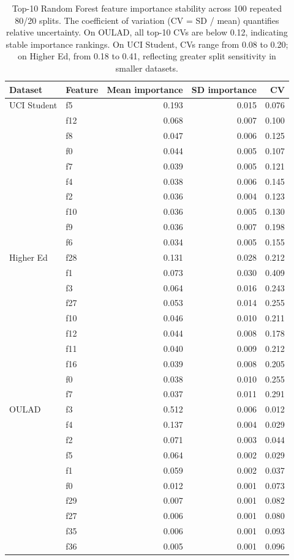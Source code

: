 \documentclass[10pt,letterpaper]{article}
\begin{document}
\begin{table}[H]
\centering
\caption{Top-10 Random Forest feature importance stability across 100 repeated 80/20 splits. The coefficient of variation (CV = SD / mean) quantifies relative uncertainty. On OULAD, all top-10 CVs are below 0.12, indicating stable importance rankings. On UCI Student, CVs range from 0.08 to 0.20; on Higher Ed, from 0.18 to 0.41, reflecting greater split sensitivity in smaller datasets.}
\label{tab:rf_importance_stability}
\small
\begin{tabular}{l l r r r}
\toprule
Dataset & Feature & Mean importance & SD importance & CV \\
\midrule
UCI Student & f5 & 0.193 & 0.015 & 0.076 \\
 & f12 & 0.068 & 0.007 & 0.100 \\
 & f8 & 0.047 & 0.006 & 0.125 \\
 & f0 & 0.044 & 0.005 & 0.107 \\
 & f7 & 0.039 & 0.005 & 0.121 \\
 & f4 & 0.038 & 0.006 & 0.145 \\
 & f2 & 0.036 & 0.004 & 0.123 \\
 & f10 & 0.036 & 0.005 & 0.130 \\
 & f9 & 0.036 & 0.007 & 0.198 \\
 & f6 & 0.034 & 0.005 & 0.155 \\
\midrule
Higher Ed & f28 & 0.131 & 0.028 & 0.212 \\
 & f1  & 0.073 & 0.030 & 0.409 \\
 & f3  & 0.064 & 0.016 & 0.243 \\
 & f27 & 0.053 & 0.014 & 0.255 \\
 & f10 & 0.046 & 0.010 & 0.211 \\
 & f12 & 0.044 & 0.008 & 0.178 \\
 & f11 & 0.040 & 0.009 & 0.212 \\
 & f16 & 0.039 & 0.008 & 0.205 \\
 & f0  & 0.038 & 0.010 & 0.255 \\
 & f7  & 0.037 & 0.011 & 0.291 \\
\midrule
OULAD & f3 & 0.512 & 0.006 & 0.012 \\
 & f4 & 0.137 & 0.004 & 0.029 \\
 & f2 & 0.071 & 0.003 & 0.044 \\
 & f5 & 0.064 & 0.002 & 0.029 \\
 & f1 & 0.059 & 0.002 & 0.037 \\
 & f0 & 0.012 & 0.001 & 0.073 \\
 & f29 & 0.007 & 0.001 & 0.082 \\
 & f27 & 0.006 & 0.001 & 0.080 \\
 & f35 & 0.006 & 0.001 & 0.093 \\
 & f36 & 0.005 & 0.001 & 0.096 \\
\bottomrule
\end{tabular}
\end{table}
\end{document}

